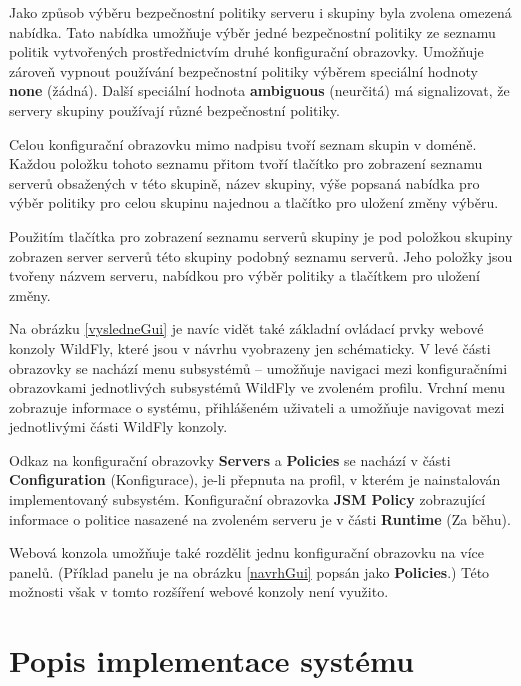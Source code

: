 Jako způsob výběru bezpečnostní politiky serveru i skupiny byla zvolena omezená nabídka. Tato nabídka umožňuje výběr jedné bezpečnostní politiky ze seznamu politik vytvořených prostřednictvím druhé konfigurační obrazovky. Umožňuje zároveň vypnout používání bezpečnostní politiky výběrem speciální hodnoty {\bf none} (žádná). Další speciální hodnota {\bf ambiguous} (neurčitá) má signalizovat, že servery skupiny používají různé bezpečnostní politiky.

Celou konfigurační obrazovku mimo nadpisu tvoří seznam skupin v doméně. Každou položku tohoto seznamu přitom tvoří tlačítko pro zobrazení seznamu serverů obsažených v této skupině, název skupiny, výše popsaná nabídka pro výběr politiky pro celou skupinu najednou a tlačítko pro uložení změny výběru.

Použitím tlačítka pro zobrazení seznamu serverů skupiny je pod položkou skupiny zobrazen server serverů této skupiny podobný seznamu serverů. Jeho položky jsou tvořeny názvem serveru, nabídkou pro výběr politiky a tlačítkem pro uložení změny.

Na obrázku \ref{vysledneGui} je navíc vidět také základní ovládací prvky webové konzoly WildFly, které jsou v návrhu vyobrazeny jen schématicky.
V levé části obrazovky se nachází menu subsystémů -- umožňuje navigaci mezi konfiguračními obrazovkami jednotlivých subsystémů WildFly ve zvoleném profilu.
Vrchní menu zobrazuje informace o systému, přihlášeném uživateli a umožňuje navigovat mezi jednotlivými části WildFly konzoly.

Odkaz na konfigurační obrazovky {\bf Servers} a {\bf Policies} se nachází v části {\bf Configuration} (Konfigurace), je-li přepnuta na profil, v kterém je nainstalován implementovaný subsystém. Konfigurační obrazovka {\bf JSM Policy} zobrazující informace o politice nasazené na zvoleném serveru je v části {\bf Runtime} (Za běhu).

Webová konzola umožňuje také rozdělit jednu konfigurační obrazovku na více panelů. (Příklad panelu je na obrázku \ref{navrhGui} popsán jako {\bf Policies}.)
Této možnosti však v tomto rozšíření webové konzoly není využito.

\chapter{Popis implementace systému} \label{implementace}

